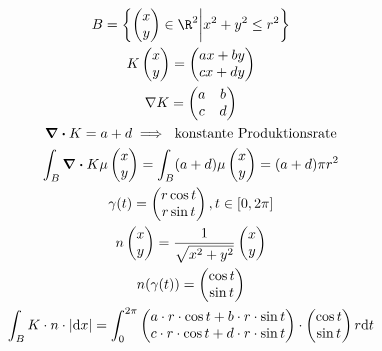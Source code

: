 \begin{bsp*}
	\begin{gather*}
		B = \left\{ \begin{pmatrix} x \\ y \end{pmatrix} \in \R^2 \middle| x^2 + y^2 \leq r^2 \right\} \\
		K\begin{pmatrix} x \\ y \end{pmatrix} = \begin{pmatrix} ax + by \\ cx + dy \end{pmatrix} \\
		\nabla K = \begin{pmatrix} a & b \\ c & d \end{pmatrix} \\
		\div K = a + d \implies \text{ konstante Produktionsrate} \\
		\int_B \div K \mu\begin{pmatrix} x \\ y \end{pmatrix} = \int_B (a + d) \mu\begin{pmatrix} x \\ y \end{pmatrix} = (a + d) \pi r^2 \\
		\gamma(t) = \begin{pmatrix} r \cos t \\ r \sin t \end{pmatrix} , t \in [ 0 , 2\pi ] \\
		n\begin{pmatrix} x \\ y \end{pmatrix} = \frac{1}{\sqrt{x^2 + y^2}} \begin{pmatrix} x \\ y \end{pmatrix} \\
		n(\gamma(t)) = \begin{pmatrix} \cos t \\ \sin t \end{pmatrix} \\
		\begin{split}
			\int_B K \cdot n \cdot \abs{\dd x}
				&= \int_0^{2\pi} \begin{pmatrix} a \cdot r \cdot \cos t + b \cdot r \cdot \sin t \\ c \cdot r \cdot \cos t + d \cdot r \cdot \sin t \end{pmatrix} \cdot \begin{pmatrix} \cos t \\ \sin t \end{pmatrix} r \dd t \\

\end{split}
\end{gather*}
\end{bsp*}

